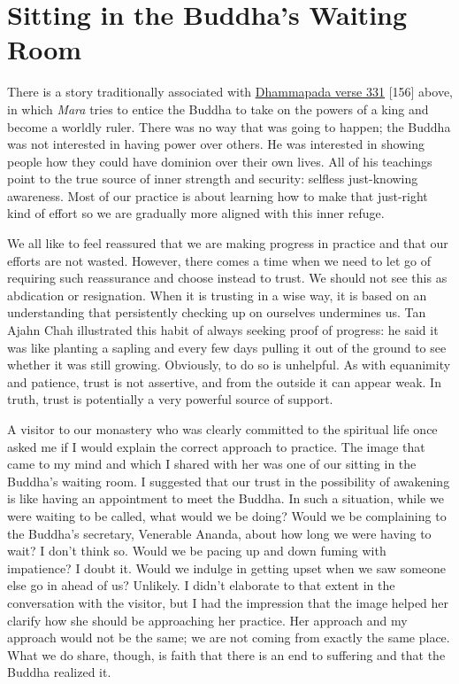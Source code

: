 \chapter{Sitting in the Buddha's Waiting Room}

There is a story traditionally associated with
\href{http://www.tipitaka.net/tipitaka/dhp/verseload.php?verse=331}{\underline{Dhammapada
verse 331}} {[}156{]} above, in which \emph{Mara} tries to entice the
Buddha to take on the powers of a king and become a worldly ruler. There
was no way that was going to happen; the Buddha was not interested in
having power over others. He was interested in showing people how they
could have dominion over their own lives. All of his teachings point to
the true source of inner strength and security: selfless just-knowing
awareness. Most of our practice is about learning how to make that
just-right kind of effort so we are gradually more aligned with this
inner refuge.

We all like to feel reassured that we are making progress in practice
and that our efforts are not wasted. However, there comes a time when we
need to let go of requiring such reassurance and choose instead to
trust. We should not see this as abdication or resignation. When it is
trusting in a wise way, it is based on an understanding that
persistently checking up on ourselves undermines us. Tan Ajahn Chah
illustrated this habit of always seeking proof of progress: he said it
was like planting a sapling and every few days pulling it out of the
ground to see whether it was still growing. Obviously, to do so is
unhelpful. As with equanimity and patience, trust is not assertive, and
from the outside it can appear weak. In truth, trust is potentially a
very powerful source of support.

A visitor to our monastery who was clearly committed to the spiritual
life once asked me if I would explain the correct approach to practice.
The image that came to my mind and which I shared with her was one of
our sitting in the Buddha's waiting room. I suggested that our trust in
the possibility of awakening is like having an appointment to meet the
Buddha. In such a situation, while we were waiting to be called, what
would we be doing? Would we be complaining to the Buddha's secretary,
Venerable Ananda, about how long we were having to wait? I don't think
so. Would we be pacing up and down fuming with impatience? I doubt it.
Would we indulge in getting upset when we saw someone else go in ahead
of us? Unlikely. I didn't elaborate to that extent in the conversation
with the visitor, but I had the impression that the image helped her
clarify how she should be approaching her practice. Her approach and my
approach would not be the same; we are not coming from exactly the same
place. What we do share, though, is faith that there is an end to
suffering and that the Buddha realized it.


